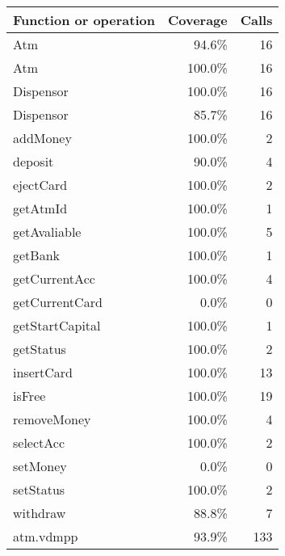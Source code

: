 \documentclass[a4paper]{article}
\begin{document}
\bigskip
\begin{longtable}{|l|r|r|}
\hline
Function or operation & Coverage & Calls \\
\hline
\hline
Atm & 94.6\% & 16 \\
\hline
Atm & 100.0\% & 16 \\
\hline
Dispensor & 100.0\% & 16 \\
\hline
Dispensor & 85.7\% & 16 \\
\hline
addMoney & 100.0\% & 2 \\
\hline
deposit & 90.0\% & 4 \\
\hline
ejectCard & 100.0\% & 2 \\
\hline
getAtmId & 100.0\% & 1 \\
\hline
getAvaliable & 100.0\% & 5 \\
\hline
getBank & 100.0\% & 1 \\
\hline
getCurrentAcc & 100.0\% & 4 \\
\hline
getCurrentCard & 0.0\% & 0 \\
\hline
getStartCapital & 100.0\% & 1 \\
\hline
getStatus & 100.0\% & 2 \\
\hline
insertCard & 100.0\% & 13 \\
\hline
isFree & 100.0\% & 19 \\
\hline
removeMoney & 100.0\% & 4 \\
\hline
selectAcc & 100.0\% & 2 \\
\hline
setMoney & 0.0\% & 0 \\
\hline
setStatus & 100.0\% & 2 \\
\hline
withdraw & 88.8\% & 7 \\
\hline
\hline
atm.vdmpp & 93.9\% & 133 \\
\hline
\end{longtable}
\end{document}
